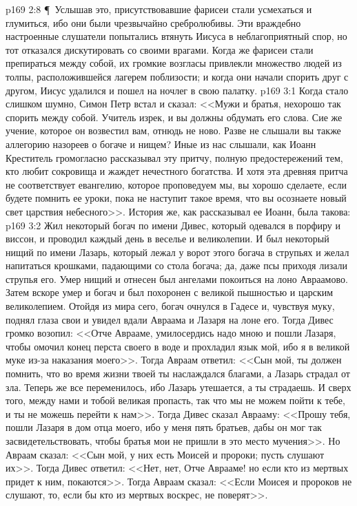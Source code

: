 \vs p169 2:8 \P\ Услышав это, присутствовавшие фарисеи стали усмехаться и глумиться, ибо они были чрезвычайно сребролюбивы. Эти враждебно настроенные слушатели попытались втянуть Иисуса в неблагоприятный спор, но тот отказался дискутировать со своими врагами. Когда же фарисеи стали препираться между собой, их громкие возгласы привлекли множество людей из толпы, расположившейся лагерем поблизости; и когда они начали спорить друг с другом, Иисус удалился и пошел на ночлег в свою палатку.
\vs p169 3:1 Когда стало слишком шумно, Симон Петр встал и сказал: <<Мужи и братья, нехорошо так спорить между собой. Учитель изрек, и вы должны обдумать его слова. Сие же учение, которое он возвестил вам, отнюдь не ново. Разве не слышали вы также аллегорию назореев о богаче и нищем? Иные из нас слышали, как Иоанн Креститель громогласно рассказывал эту притчу, полную предостережений тем, кто любит сокровища и жаждет нечестного богатства. И хотя эта древняя притча не соответствует евангелию, которое проповедуем мы, вы хорошо сделаете, если будете помнить ее уроки, пока не наступит такое время, что вы осознаете новый свет царствия небесного>>. История же, как рассказывал ее Иоанн, была такова:
\vs p169 3:2 Жил некоторый богач по имени Дивес, который одевался в порфиру и виссон, и проводил каждый день в веселье и великолепии. И был некоторый нищий по имени Лазарь, который лежал у ворот этого богача в струпьях и желал напитаться крошками, падающими со стола богача; да, даже псы приходя лизали струпья его. Умер нищий и отнесен был ангелами покоиться на лоно Авраамово. Затем вскоре умер и богач и был похоронен с великой пышностью и царским великолепием. Отойдя из мира сего, богач очнулся в Гадесе и, чувствуя муку, поднял глаза свои и увидел вдали Авраама и Лазаря на лоне его. Тогда Дивес громко возопил: <<Отче Аврааме, умилосердись надо мною и пошли Лазаря, чтобы омочил конец перста своего в воде и прохладил язык мой, ибо я в великой муке из\hyp{}за наказания моего>>. Тогда Авраам ответил: <<Сын мой, ты должен помнить, что во время жизни твоей ты наслаждался благами, а Лазарь страдал от зла. Теперь же все переменилось, ибо Лазарь утешается, а ты страдаешь. И сверх того, между нами и тобой великая пропасть, так что мы не можем пойти к тебе, и ты не можешь перейти к нам>>. Тогда Дивес сказал Аврааму: <<Прошу тебя, пошли Лазаря в дом отца моего, ибо у меня пять братьев, дабы он мог так засвидетельствовать, чтобы братья мои не пришли в это место мучения>>. Но Авраам сказал: <<Сын мой, у них есть Моисей и пророки; пусть слушают их>>. Тогда Дивес ответил: <<Нет, нет, Отче Аврааме! но если кто из мертвых придет к ним, покаются>>. Тогда Авраам сказал: <<Если Моисея и пророков не слушают, то, если бы кто из мертвых воскрес, не поверят>>.
